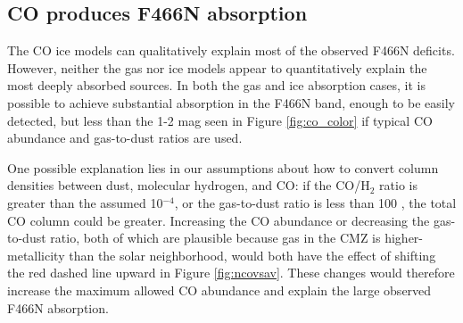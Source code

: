\documentclass[times,astrosymb,twocolumn]{aastex631}
\def\todo#1{\textcolor{red}{#1}}
\def\rr#1{#1}
\begin{document}
\subsection{CO produces F466N absorption}
\label{sec:wrapupdiscussion}
The CO ice models can qualitatively explain most of the observed F466N \rr{deficits}.
However, neither the gas nor ice models appear to quantitatively explain the most deeply absorbed sources.
In both the gas and ice absorption cases, it is possible to achieve substantial absorption in the F466N band, enough to be easily detected, but less than the 1-2 mag seen in Figure \ref{fig:co_color} if typical CO abundance and gas-to-dust ratios are used.

One possible explanation \rr{lies} in our assumptions about how to convert column densities between dust, molecular hydrogen, and CO: if the CO/H$_2$ ratio is \rr{greater} than the assumed 10$^{-4}$, or the gas-to-dust ratio is \rr{less} than 100 \citep[e.g.][]{Giannetti2017}, the total CO column could be \rr{greater}.
Increasing the CO abundance or decreasing the gas-to-dust ratio\rr{, both of which are plausible because gas in the CMZ is higher-metallicity than the solar neighborhood,} would both have the effect of shifting the red dashed line upward in Figure \ref{fig:ncovsav}.
These changes would therefore increase the maximum allowed CO abundance and explain the large observed F466N absorption.

\end{document}
